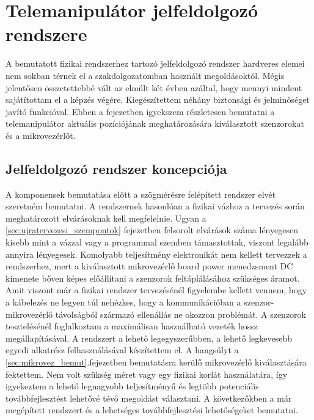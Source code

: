 \chapter{Telemanipulátor jelfeldolgozó rendszere}
\label{sec:elektronika}

A bemutatott fizikai rendszerhez tartozó jelfeldolgozó rendszer hardveres elemei nem sokban térnek el a szakdolgozatomban használt megoldásoktól. Mégis jelentősen összetettebbé vált az elmúlt két évben azáltal, hogy mennyi mindent sajátítottam el a képzés végére. Kiegészítettem néhány biztonsági és jelminőséget javító funkcióval. Ebben a fejezetben igyekszem részletesen bemutatni a telemanipulátor aktuális pozíciójának meghatározására kiválasztott szenzorokat és a mikrovezérlőt.

\section{Jelfeldolgozó rendszer koncepciója}

A komponensek bemutatása előtt a szögmérésre felépített rendszer elvét szeretném bemutatni. A rendszernek hasonlóan a fizikai vázhoz a tervezés során meghatározott elvárásoknak kell megfelelnie. Ugyan a \ref{sec:ujratervezesi_szempontok} fejezetben felsorolt elvárások száma lényegesen kisebb mint a vázzal vagy a programmal szemben támasztottak, viszont legalább annyira lényegesek. Komolyabb teljesítmény elektronikát nem kellett tervezzek a rendszerhez, mert a kiválasztott mikrovezérlő board power menedzsment DC kimenete bőven képes előállítani a szenzorok feltáplálásához szükséges áramot. Amit viszont már a fizikai rendszer tervezésénél figyelembe kellett vennem, hogy a kábelezés ne legyen túl nehézkes, hogy a kommunikációban a szenzor-mikrovezérlő távolságból származó ellenállás ne okozzon problémát. A szenzorok tesztelésénél foglalkoztam a maximálisan használható vezeték hossz megállapításával. A rendszert a lehető legegyszerűbben, a lehető legkevesebb egyedi alkatrész felhasználásával készítettem el. A hangsúlyt a \ref{sec:mikrovez_bemut}.fejezetben bemutatásra kerülő mikrovezérlő kiválasztására fektettem. Nem volt szükség méret vagy egy fizikai korlát használatára, így igyekeztem a lehető legnagyobb teljesítményű és legtöbb potenciális továbbfejlesztést lehetővé tévő megoldást választani. A következőkben a már megépített rendszert és a lehetséges továbbfejlesztési lehetőségeket bemutatni.

